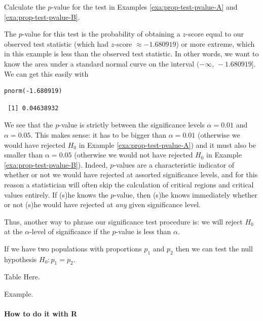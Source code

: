 \documentclass[captions=tableheading]{scrbook}
\begin{document}
\begin{example}
Calculate the \(p\)-value for the test in Examples \ref{exa:prop-test-pvalue-A} and \ref{exa:prop-test-pvalue-B}.

The \(p\)-value for this test is the probability of obtaining a \(z\)-score equal to our observed test statistic (which had \(z\)-score \(\approx-1.680919\)) or more extreme, which in this example is less than the observed test statistic. In other words, we want to know the area under a standard normal curve on the interval \((-\infty,\,-1.680919]\). We can get this easily with
\end{example}


\begin{verbatim}
pnorm(-1.680919)
\end{verbatim}

\begin{verbatim}
 [1] 0.04638932
\end{verbatim}

We see that the \(p\)-value is strictly between the significance levels \(\alpha=0.01\) and \(\alpha=0.05\). This makes sense: it has to be bigger than \(\alpha=0.01\) (otherwise we would have rejected \(H_{0}\) in Example \ref{exa:prop-test-pvalue-A}) and it must also be smaller than \(\alpha=0.05\) (otherwise we would not have rejected \(H_{0}\) in Example \ref{exa:prop-test-pvalue-B}). Indeed, \(p\)-values are a characteristic indicator of whether or not we would have rejected at assorted significance levels, and for this reason a statistician will often skip the calculation of critical regions and critical values entirely. If (s)he knows the \(p\)-value, then (s)he knows immediately whether or not (s)he would have rejected at \emph{any} given significance level.

Thus, another way to phrase our significance test procedure is: we will reject \(H_{0}\) at the \(\alpha\)-level of significance if the \(p\)-value is less than \(\alpha\).

\begin{rem}
If we have two populations with proportions \(p_{1}\) and \(p_{2}\) then we can test the null hypothesis \(H_{0}:p_{1}=p_{2}\).
\end{rem}

Table Here.

\begin{example}
Example.
\end{example}


\paragraph*{How to do it with \textsf{R}}
\end{document}
